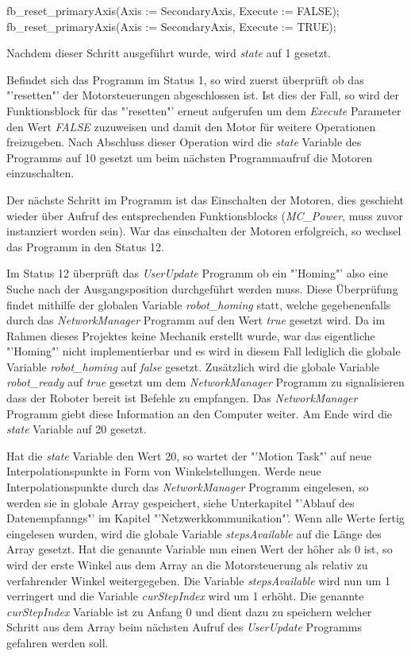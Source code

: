 fb\_reset\_primaryAxis(Axis := SecondaryAxis, Execute := FALSE);
fb\_reset\_primaryAxis(Axis := SecondaryAxis, Execute := TRUE);

Nachdem dieser Schritt ausgeführt wurde, wird \textit{state} auf 1 gesetzt. 

Befindet sich das Programm im Status 1, so wird zuerst überprüft ob das "'resetten"' der Motorsteuerungen abgeschlossen ist. Ist dies der Fall, so wird der Funktionsblock für das "'resetten"' erneut aufgerufen um dem \textit{Execute} Parameter den Wert \textit{FALSE} zuzuweisen und damit den Motor für weitere Operationen freizugeben.
Nach Abschluss dieser Operation wird die \textit{state} Variable des Programms auf 10 gesetzt um beim nächsten Programmaufruf die Motoren einzuschalten.

Der nächste Schritt im Programm ist das Einschalten der Motoren, dies geschieht wieder über Aufruf des entsprechenden Funktionsblocks (\textit{MC\_Power}, muss zuvor instanziert worden sein). War das einschalten der Motoren erfolgreich, so wechsel das Programm in den Status 12.

Im Status 12 überprüft das \textit{UserUpdate} Programm ob ein "'Homing"' also eine Suche nach der Ausgangsposition durchgeführt werden muss. Diese Überprüfung findet mithilfe der globalen Variable \textit{robot\_homing} statt, welche gegebenenfalls durch das \textit{NetworkManager} Programm auf den Wert \textit{true} gesetzt wird.
Da im Rahmen dieses Projektes keine Mechanik erstellt wurde, war das eigentliche "'Homing"' nicht implementierbar und es wird in diesem Fall lediglich die globale Variable \textit{robot\_homing} auf \textit{false} gesetzt. Zusätzlich wird die globale Variable \textit{robot\_ready} auf \textit{true} gesetzt um dem \textit{NetworkManager} Programm zu signalisieren dass der Roboter bereit ist Befehle zu empfangen. Das \textit{NetworkManager} Programm giebt diese Information an den Computer weiter. Am Ende wird die \textit{state} Variable auf 20 gesetzt.

Hat die \textit{state} Variable den Wert 20, so wartet der "'Motion Task"' auf neue Interpolationspunkte in Form von Winkelstellungen. Werde neue Interpolationspunkte durch das \textit{NetworkManager} Programm eingelesen, so werden sie in globale Array gespeichert, siehe Unterkapitel "'Ablauf des Datenempfanngs"' im Kapitel "'Netzwerkkommunikation"'. Wenn alle Werte fertig eingelesen wurden, wird die globale Variable \textit{stepsAvailable} auf die Länge des Array gesetzt. Hat die genannte Variable nun einen Wert der höher als 0 ist, so wird der erste Winkel aus dem Array an die Motorsteuerung als relativ zu verfahrender Winkel weitergegeben. Die Variable \textit{stepsAvailable} wird nun um 1 verringert und die Variable \textit{curStepIndex} wird um 1 erhöht. Die genannte \textit{curStepIndex} Variable ist zu Anfang 0 und dient dazu zu speichern welcher Schritt aus dem Array beim nächsten Aufruf des \textit{UserUpdate} Programms gefahren werden soll.

